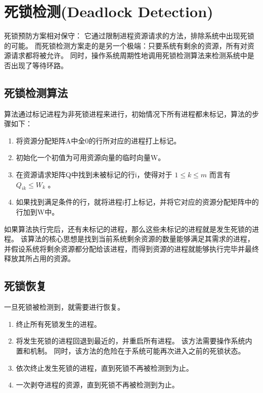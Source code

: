 
\section{死锁检测(Deadlock Detection)}
{
    死锁预防方案相对保守：
    它通过限制进程资源请求的方法，排除系统中出现死锁的可能。
    而死锁检测方案走的是另一个极端：只要系统有剩余的资源，所有对资源请求都将被允许。
    同时，操作系统周期性地调用死锁检测算法来检测系统中是否出现了等待环路。

    \subsection{死锁检测算法}
    {
        算法通过标记进程为非死锁进程来进行，初始情况下所有进程都未标记，算法的步骤如下：

        \begin{enumerate}
            \item 将资源分配矩阵A中全0的行所对应的进程打上标记。
            \item 初始化一个初值为可用资源向量的临时向量W。
            \item 在资源请求矩阵Q中找到未被标记的行i，使得对于 $1 \leq k \leq m$ 而言有 $Q_{ik} \leq W_k$ 。
            \item 如果找到满足条件的行，就将进程i打上标记，并将它对应的资源分配矩阵中的行加到W中。
        \end{enumerate}

        如果算法执行完后，还有未标记的进程，那么这些未标记的进程就是发生死锁的进程。
        该算法的核心思想是找到当前系统剩余资源的数量能够满足其需求的进程，并假设系统将剩余资源都分配给该进程，而得到资源的进程就能够执行完毕并最终释放其所占用的资源。
    }

    \subsection{死锁恢复}
    {
        一旦死锁被检测到，就需要进行恢复。

        \begin{enumerate}
            \item 终止所有死锁发生的进程。
            \item
            {
                将发生死锁的进程回退到最近的，并重启所有进程。
                该方法需要操作系统内置和机制。
                同时，该方法的危险在于系统可能再次进入之前的死锁状态。
            }
            \item 依次终止发生死锁的进程，直到死锁不再被检测到为止。
            \item 一次剥夺进程的资源，直到死锁不再被检测到为止。
        \end{enumerate}
    }
}
